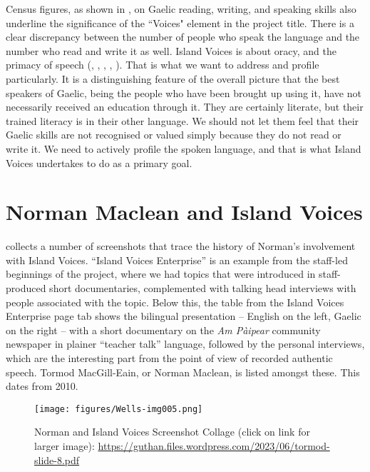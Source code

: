 \documentclass[output=paper,colorlinks,citecolor=brown]{langscibook}
\begin{document}
\largerpage
Census figures, as shown in , 
on Gaelic reading, writing, and speaking skills also underline the significance of the ``Voices" element in the project title. There is a clear discrepancy between the number of people who speak the language and the number who read and write it as well. Island Voices is about oracy, and the primacy of speech 
(\citealt{gw:Sapir1921}, \citealt{gw:Bloomfield1933}, \citealt{gw:deSaussure1966}, \citealt{gw:ChafeTannen1987}, \citealt{gw:Wells2020}). 
That is what we want to address and profile particularly. It is a distinguishing feature of the overall picture that the best speakers of Gaelic, being the people who have been brought up using it, have not necessarily received an education through it. They are certainly literate, but their trained literacy is in their other language. We should not let them feel that their Gaelic skills are not recognised or valued simply because they do not read or write it. We need to actively profile the spoken language, and that is what Island Voices undertakes to do as a primary goal.

\section{Norman Maclean and Island Voices}


 collects a number of screenshots that trace the history of Norman’s involvement with Island Voices. ``Island Voices Enterprise” is an example from the staff-led beginnings of the project, where we had topics that were introduced in staff-produced short documentaries, complemented with talking head interviews with people associated with the topic. Below this, the table from the Island Voices Enterprise page tab shows the bilingual presentation – English on the left, Gaelic on the right – with a short documentary on the \textit{Am Pàipear} community newspaper in plainer ``teacher talk” language, followed by the personal interviews, which are the interesting part from the point of view of recorded authentic speech. Tormod MacGill-Eain, or Norman Maclean, is listed amongst these. This dates from 2010.
 
 \begin{figure}
    \texttt{[image: figures/Wells-img005.png]}
    \caption{Norman and Island Voices Screenshot Collage (click on link for larger image): \url{https://guthan.files.wordpress.com/2023/06/tormod-slide-8.pdf}} 
    \label{fig:wells:5}
\end{figure}
\end{document}
